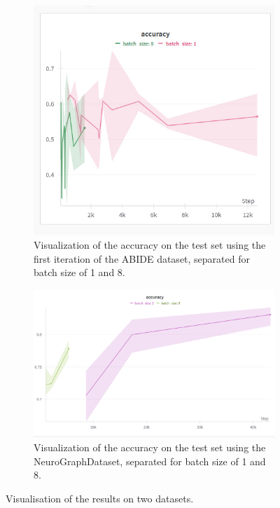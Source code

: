 	
	\begin{figure}[!h]
		\centering
		\begin{subfigure}[t][][t]{0.45\textwidth}
			\centering
			\includegraphics[width=\textwidth]{figures/3site_runs.jpg}
			\caption{Visualization of the accuracy on the test set using the first iteration of the ABIDE dataset, separated for batch size of 1 and 8.}
			\label{fig:3site_runs}
		\end{subfigure}
		\hfill
		\begin{subfigure}[t][][t]{0.50\textwidth}
			\centering
			\includegraphics[width=\textwidth]{figures/ng_accuracy.png}
			\caption{Visualization of the accuracy on the test set using the NeuroGraphDataset, separated for batch size of 1 and 8.}
			\label{fig:neurograph}
		\end{subfigure}
		
		\caption{Visualisation of the results on two datasets.}
	\end{figure}
	
